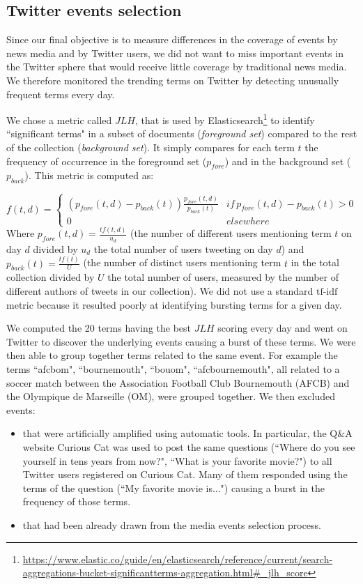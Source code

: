 \subsection{Twitter events selection}
\label{Twitter events selection}
Since our final objective is to measure differences in the coverage of events by news media and by Twitter users, we did not want to miss important events in the Twitter sphere that would receive little coverage by traditional news media. We therefore monitored the trending terms on Twitter by detecting unusually frequent terms every day. 


We chose a metric called $JLH$, that is used by Elasticsearch\footnote{\url{https://www.elastic.co/guide/en/elasticsearch/reference/current/search-aggregations-bucket-significantterms-aggregation.html\#_jlh_score}}  to identify ``significant terms" in a subset of documents (\textit{foreground set}) compared to the rest of the collection (\textit{background set}). It simply compares for each term $t$ the frequency of occurrence in the foreground set ($p_{fore}$) and in the background set ($p_{back}$). This metric is computed as:

$$
f(t,d) = \left\{
	\begin{array}{ll}
		(p_{fore}(t,d) - p_{back}(t))\frac{p_{fore}(t,d)}{p_{back}(t)} & if\, p_{fore}(t,d) - p_{back}(t) > 0\\
		0 & elsewhere
	\end{array}
\right.
$$
Where $p_{fore}(t,d) = \frac{tf(t,d)}{u_d}$  (the number of different users mentioning term $t$ on day $d$ divided by $u_d$ the total number of users tweeting on day $d$) and $p_{back}(t)  = \frac{tf(t)}{U}$ (the number of distinct users mentioning term $t$ in the total collection divided by $U$  the total number of users, measured by the number of different authors of tweets in our collection). We did not use a standard $\mbox{tf-idf}$ metric because it resulted poorly at identifying bursting terms for a given day.


We computed the 20 terms having the best $JLH$ scoring every day and went on Twitter to discover the underlying events causing a burst of these terms. We were then able to group together terms related to the same event. For example the terms ``afcbom", ``bournemouth", ``bouom", ``afcbournemouth", all related to a soccer match between the Association Football Club Bournemouth (AFCB) and the Olympique de Marseille (OM), were grouped together. We then excluded events:
\begin{itemize}
\item that were artificially amplified using automatic tools. In particular, the Q\&A website Curious Cat was used to post the same questions (``Where do you see yourself in tens years from now?", ``What is your favorite movie?") to all Twitter users registered on Curious Cat. Many of them responded using the terms of the question (``My favorite movie is...") causing a burst in the frequency of those terms.
\item that had been already drawn from the media events selection process.
\end{itemize}

